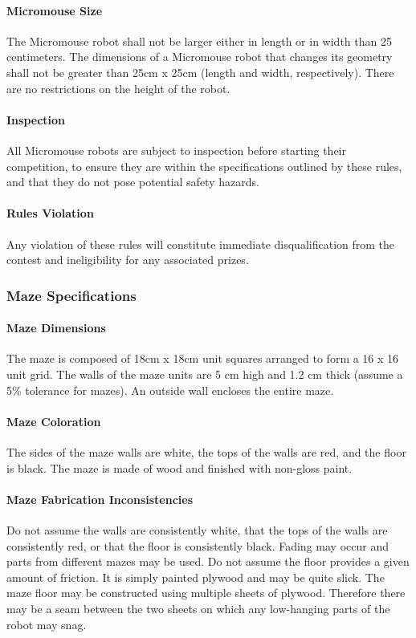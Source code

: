 \documentclass[12pt]{article}
\begin{document}
\paragraph{\gls{Micromouse} Size}
The \gls{Micromouse} robot shall not be larger either in length or in width than 25
centimeters. The dimensions of a \gls{Micromouse} robot that changes its geometry shall not
be greater than 25cm x 25cm (length and width, respectively). There are no restrictions
on the height of the robot.
\paragraph{Inspection}
All \gls{Micromouse} robots are subject to inspection before starting their competition, to
ensure they are within the specifications outlined by these rules, and that they do not
pose potential safety hazards.
\paragraph{Rules Violation}
Any violation of these rules will constitute immediate disqualification from the contest
and ineligibility for any associated prizes.
\subsubsection{Maze Specifications}
\paragraph{Maze Dimensions}
The \gls{maze} is composed of 18cm x 18cm unit squares arranged to form a 16 x 16 unit grid.
The walls of the \gls{maze} units are 5 cm high and 1.2 cm thick (assume a 5\% tolerance
for \gls{maze}s). An outside wall encloses the entire \gls{maze}.
\paragraph{Maze Coloration}
The sides of the \gls{maze} walls are white, the tops of the walls are red, and the floor is
black. The \gls{maze} is made of wood and finished with non-gloss paint.
\paragraph{Maze Fabrication Inconsistencies}
Do not assume the walls are consistently white, that the tops of the walls are
consistently red, or that the floor is consistently black. Fading may occur and
parts from different \gls{maze}s may be used. Do not assume the floor provides a
given amount of friction. It is simply painted plywood and may be quite slick. The
\gls{maze} floor may be constructed using multiple sheets of plywood. Therefore
there may be a seam between the two sheets on which any low-hanging parts of
the robot may snag.
\end{document}
